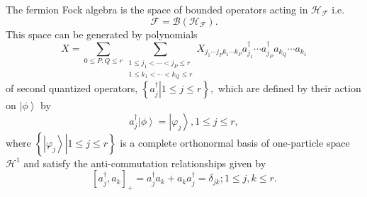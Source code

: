 \documentclass[aps,preprint]{revtex4}%
\begin{document}
The fermion Fock algebra is the space of bounded operators acting in
$\mathcal{H}_{\mathcal{F}}$ i.e.
\begin{equation}
\mathcal{F}=\mathcal{B}\left(  \mathcal{H}_{\mathcal{F}}\right)  .
\end{equation}
This space can be generated by polynomials
\begin{equation}
X=\sum_{0\leq P,Q\leq r}\sum_{\substack{1\leq j_{1}<\cdots<j_{P}\leq r\\1\leq
k_{1}<\cdots<k_{Q}\leq r}}X_{j_{1}\cdots j_{P}k_{1}\cdots k_{P}}a_{j_{1}%
}^{\dagger}\cdots a_{j_{P}}^{\dagger}a_{k_{Q}}\cdots a_{k_{1}}%
\end{equation}
of second quantized operators, $\left\{  \left.  a_{j}^{\dagger}\right\vert
1\leq j\leq r\right\}  ,$ which are defined by their action on $\left\vert
\phi\right\rangle $ by
\begin{equation}
a_{j}^{\dagger}\left\vert \phi\right\rangle =\left\vert \varphi_{j}%
\right\rangle ,1\leq j\leq r,
\end{equation}
where $\left\{  \left.  \left\vert \varphi_{j}\right\rangle \right\vert 1\leq
j\leq r\right\}  $ is a complete orthonormal basis of one-particle space
$\mathcal{H}^{1}$ and satisfy the anti-commutation relationships given by
\begin{equation}
\left[  a_{j}^{\dagger},a_{k}\right]  _{+}=a_{j}^{\dagger}a_{k}+a_{k}%
a_{j}^{\dagger}=\delta_{jk};1\leq j,k\leq r.\label{CAR}%
\end{equation}
\end{document}
